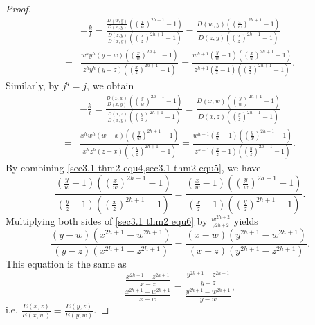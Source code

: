 \documentclass[10pt]{article}%
\begin{document}
\begin{proof}
\begin{equation}
		 	\begin{aligned}
		 		&-\frac{k}{l}=\frac{\frac{D(w,y)}{D(x,y)}\left(\left(\frac{x}{w}\right)^{2h+1}-1\right)}{\frac{D(z,y)}{D(x,y)}\left(\left(\frac{x}{z}\right)^{2h+1}-1\right)}=\frac{D(w,y)\left(\left(\frac{x}{w}\right)^{2h+1}-1\right)}{D(z,y)\left(\left(\frac{x}{z}\right)^{2h+1}-1\right)}\\
		 		=&\frac{w^hy^h(y-w)\left(\left(\frac{x}{w}\right)^{2h+1}-1\right)}{z^hy^h(y-z)\left(\left(\frac{x}{z}\right)^{2h+1}-1\right)}=\frac{w^{h+1}(\frac{y}{w}-1)\left(\left(\frac{x}{w}\right)^{2h+1}-1\right)}{z^{h+1}(\frac{y}{z}-1)\left(\left(\frac{x}{z}\right)^{2h+1}-1\right)}.
		 	\end{aligned}
		 \end{equation}
		 Similarly, by $j^q=j$, we obtain
		 \begin{equation}\label{sec3.1 thm2 equ5}
		 	\begin{aligned}
		 		&-\frac{k}{l}=\frac{\frac{D(x,w)}{D(x,y)}\left(\left(\frac{y}{w}\right)^{2h+1}-1\right)}{\frac{D(x,z)}{D(x,y)}\left(\left(\frac{y}{z}\right)^{2h+1}-1\right)}=\frac{D(x,w)\left(\left(\frac{y}{w}\right)^{2h+1}-1\right)}{D(x,z)\left(\left(\frac{y}{z}\right)^{2h+1}-1\right)}\\
		 		=&\frac{x^hw^h(w-x)\left(\left(\frac{y}{w}\right)^{2h+1}-1\right)}{x^hz^h(z-x)\left(\left(\frac{y}{z}\right)^{2h+1}-1\right)}=\frac{w^{h+1}(\frac{x}{w}-1)\left(\left(\frac{y}{w}\right)^{2h+1}-1\right)}{z^{h+1}(\frac{x}{z}-1)\left(\left(\frac{y}{z}\right)^{2h+1}-1\right)}.
		 	\end{aligned}
		 \end{equation}
		 By combining \cref{sec3.1 thm2 equ4,sec3.1 thm2 equ5}, we have
		 \begin{equation}\label{sec3.1 thm2 equ6}
		 	\frac{(\frac{y}{w}-1)\left(\left(\frac{x}{w}\right)^{2h+1}-1\right)}{(\frac{y}{z}-1)\left(\left(\frac{x}{z}\right)^{2h+1}-1\right)}=\frac{(\frac{x}{w}-1)\left(\left(\frac{y}{w}\right)^{2h+1}-1\right)}{(\frac{x}{z}-1)\left(\left(\frac{y}{z}\right)^{2h+1}-1\right)}.
		 \end{equation}
		 Multiplying both sides of \cref{sec3.1 thm2 equ6} by $\frac{w^{2h+2}}{z^{2h+2}}$ yields
		 \begin{equation*}
		 	\frac{(y-w)\left({x}^{2h+1}-{w}^{2h+1}\right)}{(y-z)\left({x}^{2h+1}-{z}^{2h+1}\right)}=\frac{(x-w)\left({y}^{2h+1}-{w}^{2h+1}\right)}{(x-z)\left({y}^{2h+1}-{z}^{2h+1}\right)}.
		 \end{equation*}
		 This equation is the same as
		 \begin{equation}\label{sec3.1 thm2 equ7}
		 	\frac{\frac{{x}^{2h+1}-{z}^{2h+1}}{x-z}}{\frac{{x}^{2h+1}-{w}^{2h+1}}{x-w}}=\frac{\frac{{y}^{2h+1}-{z}^{2h+1}}{y-z}}{\frac{{y}^{2h+1}-{w}^{2h+1}}{y-w}},
		 \end{equation}
		 i.e. $\frac{E(x,z)}{E(x,w)}=\frac{E(y,z)}{E(y,w)}$.
		 

\end{proof}
\end{document}
